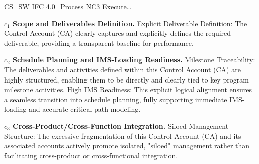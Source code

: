 %
\begin{frame}{CS\_SW IFC 4.0\_Process NC3 Execute\ldots{}}
\begin{minipage}{0.90\textwidth}
\raggedright
\fontsize{8}{9.5}\selectfont
\textbf{\(c_1\) Scope and Deliverables Definition.}
Explicit Deliverable Definition: The Control Account (CA) clearly captures and explicitly defines the required deliverable, providing a transparent baseline for performance.\par\vspace{0.6em}
\textbf{\(c_2\) Schedule Planning and IMS-Loading Readiness.}
Milestone Traceability: The deliverables and activities defined within this Control Account (CA) are highly structured, enabling them to be directly and clearly tied to key program milestone activities. High IMS Readiness: This explicit logical alignment ensures a seamless transition into schedule planning, fully supporting immediate IMS-loading and accurate critical path modeling.\par\vspace{0.6em}
\textbf{\(c_3\) Cross-Product/Cross-Function Integration.}
Siloed Management Structure: The excessive fragmentation of this Control Account (CA) and its associated accounts actively promote isolated, "siloed" management rather than facilitating cross-product or cross-functional integration.\par\vspace{0.6em}
\end{minipage}
\end{frame}

\endinput
